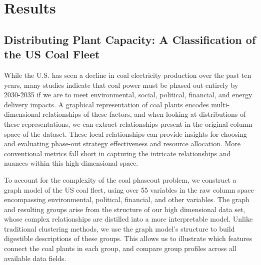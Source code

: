 \section{Results}

\subsection{Distributing Plant Capacity: A Classification of the US Coal Fleet}

While the U.S. has seen a decline in coal electricity production over the past ten years, many studies indicate that coal power must be phased out entirely 
by 2030-2035 if we are to meet environmental, social, political, financial, and energy delivery impacts. A graphical representation of coal plants encodes 
multi-dimensional relationships of these factors, and when looking at distributions of these representations, we can extract relationships present in the original 
column-space of the dataset. These local relationships can provide insights for choosing and evaluating phase-out strategy effectiveness and resource allocation. 
More conventional metrics fall short in capturing the intricate relationships and nuances within this high-dimensional space.

To account for the complexity of the coal phaseout problem, we construct a graph model of the US coal fleet, using over 55 variables in the raw column space 
encompassing environmental, political, financial, and other variables. The graph and resulting groups arise from the structure of our high dimensional data set, 
whose complex relationships are distilled into a more interpretable model. Unlike traditional clustering methods, we use the graph model’s structure to build 
digestible descriptions of these groups. This allows us to illustrate which features connect the coal plants in each group, and compare group profiles across all 
available data fields.

\vspace{\baselineskip}




